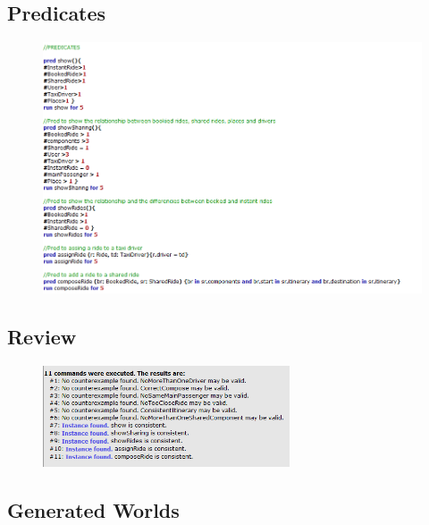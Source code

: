 \newpage\subsection{Predicates}
\begin{figure}[h!]
		\centering
		\includegraphics[height=0.65\textwidth]{"myTaxiServiceImg/Alloy/Predicates"}
\end{figure}

\subsection{Review}
\begin{figure}[h!]
		\centering
		\includegraphics[width=0.65\textwidth]{"myTaxiServiceImg/Alloy/Review"}
\end{figure}

\newpage

\subsection{Generated Worlds}
